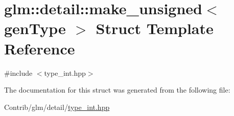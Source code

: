 \hypertarget{structglm_1_1detail_1_1make__unsigned}{}\section{glm\+:\+:detail\+:\+:make\+\_\+unsigned$<$ gen\+Type $>$ Struct Template Reference}
\label{structglm_1_1detail_1_1make__unsigned}


{\ttfamily \#include $<$type\+\_\+int.\+hpp$>$}



The documentation for this struct was generated from the following file\+:\begin{DoxyCompactItemize}
\item 
Contrib/glm/detail/\mbox{\hyperlink{type__int_8hpp}{type\+\_\+int.\+hpp}}\end{DoxyCompactItemize}
